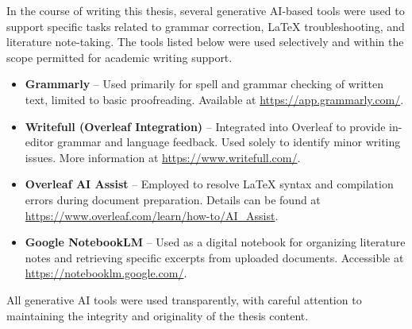 \documentclass[draft,final]{vutinfth} %
\begin{document}

\backmatter

\begin{aitools}

In the course of writing this thesis, several generative AI-based tools were used to support specific tasks related to grammar correction, LaTeX troubleshooting, and literature note-taking. The tools listed below were used selectively and within the scope permitted for academic writing support.

\begin{itemize}
    \item \textbf{Grammarly} -- Used primarily for spell and grammar checking of written text, limited to basic proofreading. Available at \url{https://app.grammarly.com/}.
    
    \item \textbf{Writefull (Overleaf Integration)} -- Integrated into Overleaf to provide in-editor grammar and language feedback. Used solely to identify minor writing issues. More information at \url{https://www.writefull.com/}.
    
    \item \textbf{Overleaf AI Assist} -- Employed to resolve LaTeX syntax and compilation errors during document preparation. Details can be found at \url{https://www.overleaf.com/learn/how-to/AI_Assist}.
    
    \item \textbf{Google NotebookLM} -- Used as a digital notebook for organizing literature notes and retrieving specific excerpts from uploaded documents. Accessible at \url{https://notebooklm.google.com/}.
\end{itemize}

All generative AI tools were used transparently, with careful attention to maintaining the integrity and originality of the thesis content.
\end{aitools}

\listoffigures %

\cleardoublepage %
\listoftables %

\listofalgorithms
{}

\printindex

\printglossaries




\appendix

\end{document}
